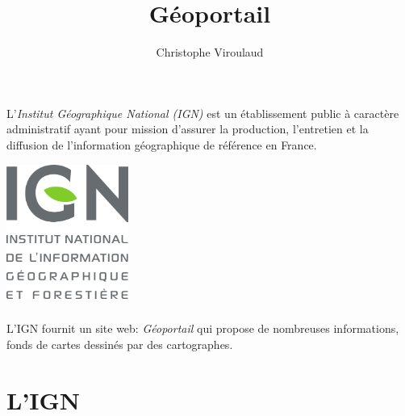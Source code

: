 \documentclass[svgnames,11pt]{beamer}
\author[]{Christophe Viroulaud}
\title{Géoportail}
\date{}
\institute{Seconde - SNT}
\begin{document}
\begin{frame}
    \titlepage
\end{frame}
\begin{frame}
    \frametitle{}

    L'\emph{Institut Géographique National (IGN)} est un établissement public à caractère administratif ayant pour mission d'assurer la production, l'entretien et la diffusion de l'information géographique de référence en France.
    \begin{center}
        \centering
        \includegraphics[width=4cm]{ressources/ign.png}
    \end{center}
\end{frame}
\begin{frame}
    \frametitle{}
    L'IGN fournit un site web: \emph{Géoportail} qui propose de nombreuses informations, fonds de cartes dessinés par des cartographes.
    \begin{center}
    \end{center}

\end{frame}
\section{L'IGN}
\end{document}
